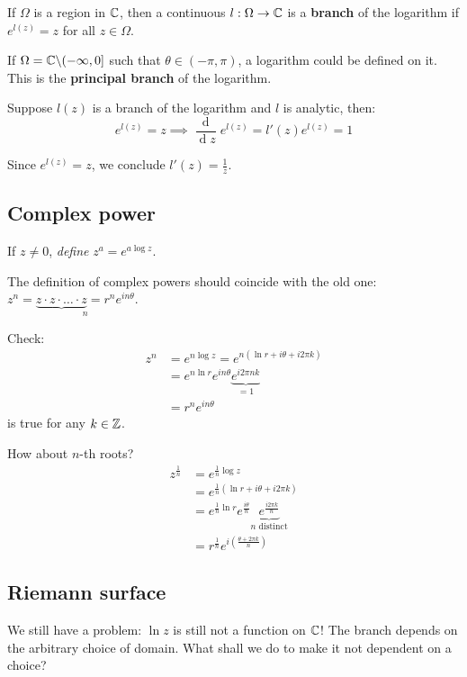 \documentclass[12pt]{article}
\renewcommand{\d}{\ensuremath{\operatorname{d}}}
\begin{document}
 If $\Omega$ is a region in $\mathbb{C}$, then a continuous $l:\Omega \to \mathbb{C}$ is a \textbf{branch} of the logarithm if $e^{l(z)}=z$ for all $z\in \Omega$.

\eg If $\Omega=\mathbb{C}\backslash(-\infty, 0]$ such that $\theta\in (-\pi,\pi)$, a logarithm could be defined on it. This is the \textbf{principal branch} of the logarithm.
\sidenote{\def\svgwidth{\linewidth}\[\]}

\rmk Suppose $l(z)$ is a branch of the logarithm and $l$ is analytic, then: \[e^{l(z)}=z\implies \frac{\d}{\d z}e^{l(z)} = l'(z)e^{l(z)}=1\]

Since $e^{l(z)}=z$, we conclude $l'(z)=\frac{1}{z}$.

\subsection{Complex power}
 If $z\neq 0$, \textit{define} $z^{a}=e^{a\log z}$.

\rmk The definition of complex powers should coincide with the old one: $z^n=\underset{n}{\underbrace{z\cdot z\cdot\dots\cdot z}=r^ne^{in\theta}}$.

Check: \begin{align*}
    z^n&=e^{n\log z}=e^{n(\ln r+i\theta+i2\pi k)}\\
    &= e^{n\ln r}e^{in\theta}\underset{=1}{\underbrace{e^{i2\pi nk}}}\\
    &= r^ne^{in\theta}
\end{align*} is true for any $k\in \mathbb{Z}$.

How about $n$-th roots?
\begin{align*}
    z^{\frac{1}{n}} &= e^{\frac{1}{n}\log z}\\
    &= e^{\frac{1}{n}(\ln r+i\theta+i2\pi k)}\\
    &= e^{\frac{1}{n}\ln r}e^{\frac{i\theta}{n}}\underset{\text{$n$ distinct}}{\underbrace{e^{\frac{i2\pi k}{n}}}}\\
    &= r^{\frac{1}{n}} e^{i\left(\frac{\theta+2\pi k}{n}\right)}
\end{align*}

\subsection{Riemann surface}
We still have a problem: $\ln z$ is still not a function on $\mathbb{C}$! The branch depends on the arbitrary choice of domain. What shall we do to make it not dependent on a choice?
\end{document}
